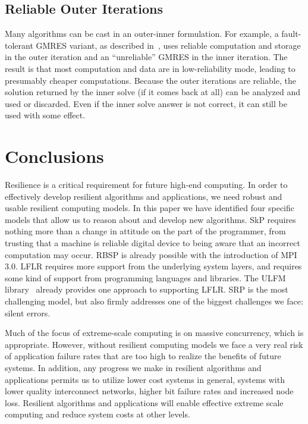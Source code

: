 \documentclass[10pt, twocolumn]{IEEEtran}
\begin{document}
\subsection{Reliable Outer Iterations}

Many algorithms can be cast in an outer-inner formulation.  For example, a fault-tolerant GMRES variant, as described in~\cite{2012arXiv1206.1390B}, uses reliable computation and storage in the outer iteration and an ``unreliable'' GMRES in the inner iteration.  The result is that most computation and data are in low-reliability mode, leading to presumably cheaper computations.  Because the outer iterations are reliable, the solution returned by the inner solve (if it comes back at all) can be analyzed and used or discarded.  Even if the inner solve answer is not correct, it can still be used with some effect.


\section{Conclusions}

Resilience is a critical requirement for future high-end computing.  In order to effectively develop resilient algorithms and applications, we need robust and usable resilient computing models.  In this paper we have identified four specific models that allow us to reason about and develop new algorithms.  SkP requires nothing more than a change in attitude on the part of the programmer, from trusting that a machine is reliable digital device to being aware that an incorrect computation may occur.  RBSP is already possible with the introduction of MPI 3.0.  LFLR requires more support from the underlying system layers, and requires some kind of support from programming languages and libraries.  The ULFM library~\cite{Bland2013,ULFM} already provides one approach to supporting LFLR.  SRP is the most challenging model, but also firmly addresses one of the biggest challenges we face: silent errors.

Much of the focus of extreme-scale computing is on massive concurrency, which is appropriate.  However, without resilient computing models we face a very real risk of application failure rates that are too high to realize the benefits of future systems.  In addition, any progress we make in resilient algorithms and applications permits us to utilize lower cost systems in general, systems with lower quality interconnect networks, higher bit failure rates and increased node loss.  Resilient algorithms and applications will enable effective extreme scale computing and reduce system costs at other levels.  



\end{document}
